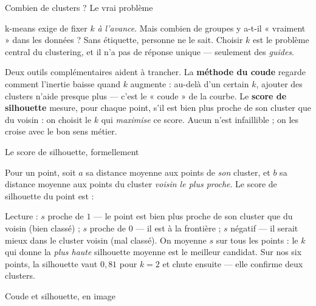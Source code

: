 \documentclass[aspectratio=169,11pt]{beamer}
\begin{document}
\begin{frame}{Combien de clusters ? Le vrai problème}
\begin{ucadfront}
{\small k-means exige de fixer $k$ \emph{à l'avance}. Mais combien de groupes y a-t-il « vraiment » dans les données ? Sans étiquette, personne ne le sait. Choisir $k$ est le problème central du clustering, et il n'a pas de réponse unique — seulement des \emph{guides}.}
\end{ucadfront}
{\small Deux outils complémentaires aident à trancher. La \textbf{méthode du coude} regarde comment l'inertie baisse quand $k$ augmente : au-delà d'un certain $k$, ajouter des clusters n'aide presque plus — c'est le « coude » de la courbe. Le \textbf{score de silhouette} mesure, pour chaque point, s'il est bien plus proche de son cluster que du voisin : on choisit le $k$ qui \emph{maximise} ce score. Aucun n'est infaillible ; on les croise avec le bon sens métier.}
\end{frame}

\begin{frame}{Le score de silhouette, formellement}
\begin{ucaddef}[Définition]
{\small Pour un point, soit $a$ sa distance moyenne aux points de \emph{son} cluster, et $b$ sa distance moyenne aux points du cluster \emph{voisin le plus proche}. Le score de silhouette du point est :}
\end{ucaddef}
{\small Lecture : $s$ proche de $1$ — le point est bien plus proche de son cluster que du voisin (bien classé) ; $s$ proche de $0$ — il est à la frontière ; $s$ négatif — il serait mieux dans le cluster voisin (mal classé). On moyenne $s$ sur tous les points : le $k$ qui donne la \emph{plus haute} silhouette moyenne est le meilleur candidat. Sur nos six points, la silhouette vaut $0{,}81$ pour $k=2$ et chute ensuite — elle confirme deux clusters.}
\end{frame}

\begin{frame}{Coude et silhouette, en image}
\end{frame}
\end{document}
